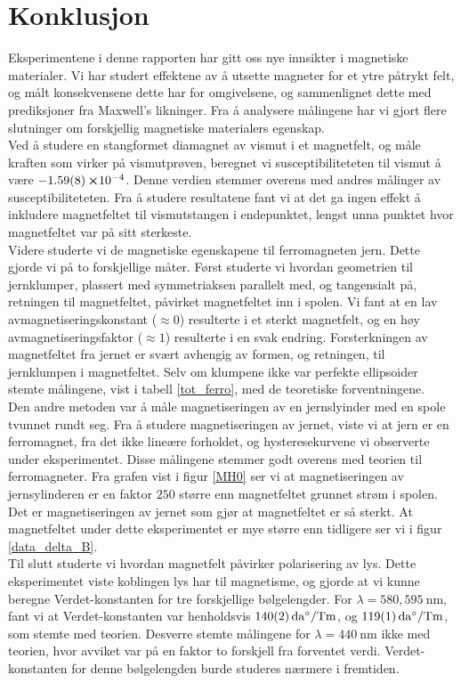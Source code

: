 \documentclass[%
 reprint,
 amsmath,amssymb,
 aps,
 norsk,
]{revtex4-1}
\begin{document}
\section{Konklusjon}
Eksperimentene i denne rapporten har gitt oss nye innsikter i magnetiske materialer. Vi har studert effektene av å utsette magneter for et ytre påtrykt felt, og målt konsekvensene dette har for omgivelsene, og sammenlignet dette med prediksjoner fra Maxwell's likninger. Fra å analysere målingene har vi gjort flere slutninger om forskjellig magnetiske materialers egenskap.\\
Ved å studere en stangformet diamagnet av vismut i et magnetfelt, og måle kraften som virker på vismutprøven, beregnet vi susceptibiliteteten til vismut å være $-\SI{1.59\pm0.08}\cross 10^{-4}$. Denne verdien stemmer overens med andres målinger av susceptibiliteteten. Fra å studere resultatene fant vi at det ga ingen effekt å inkludere magnetfeltet til vismutstangen i endepunktet, lengst unna punktet hvor magnetfeltet var på sitt sterkeste.\\
Videre studerte vi de magnetiske egenskapene til ferromagneten jern. Dette gjorde vi på to forskjellige måter. Først studerte vi hvordan geometrien til jernklumper, plassert med symmetriaksen parallelt med, og tangensialt på, retningen til magnetfeltet, påvirket magnetfeltet inn i spolen. Vi fant at en lav avmagnetiseringskonstant ($\approx 0$) resulterte i et sterkt magnetfelt, og en høy avmagnetiseringsfaktor ($\approx 1$) resulterte i en svak endring. Forsterkningen av magnetfeltet fra jernet er svært avhengig av formen, og retningen, til jernklumpen i magnetfeltet. Selv om klumpene ikke var perfekte ellipsoider stemte målingene, vist i tabell \vref{tot_ferro}, med de teoretiske forventningene.\\
Den andre metoden var å måle magnetiseringen av en jernslyinder med en spole tvunnet rundt seg. Fra å studere magnetiseringen av jernet, viste vi at jern er en ferromagnet, fra det ikke lineære forholdet, og hysteresekurvene vi observerte under eksperimentet. Disse målingene stemmer godt overens med teorien til ferromagneter. Fra grafen vist i figur \vref{MH0} ser vi at magnetiseringen av jernsylinderen er en faktor $250$ større enn magnetfeltet grunnet strøm i spolen. Det er magnetiseringen av jernet som gjør at magnetfeltet er så sterkt. At magnetfeltet under dette eksperimentet er mye større enn tidligere ser vi i figur \vref{data_delta_B}. \\
Til slutt studerte vi hvordan magnetfelt påvirker polarisering av lys. Dette eksperimentet viste koblingen lys har til magnetisme, og gjorde at vi kunne beregne Verdet-konstanten for tre forskjellige bølgelengder. For $\lambda = 580, \SI{595}{\nano\meter}$, fant vi at Verdet-konstanten var henholdsvis $\SI{140\pm2}{\deca\degree/\tesla\meter}$, og $\SI{119\pm1}{\deca\degree/\tesla\meter}$, som stemte med teorien. Desverre stemte målingene for $\lambda=\SI{440}{\nano\meter}$ ikke med teorien, hvor avviket var på en faktor to forskjell fra forventet verdi. Verdet-konstanten for denne bølgelengden burde studeres nærmere i fremtiden.
{}

\end{document}
